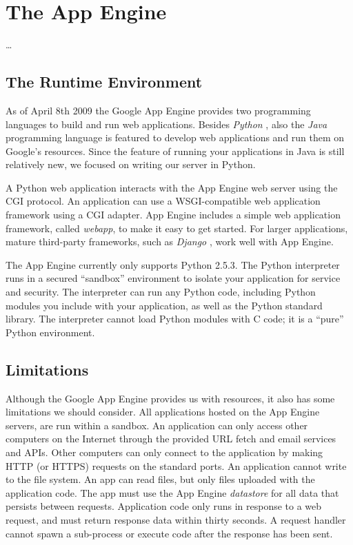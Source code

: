 \section{The App Engine}
\ldots

\subsection{The Runtime Environment}
As of April 8th 2009 \cite{app-engine-java} the Google App Engine provides two
programming languages to build and run web applications. Besides \emph{Python}
\cite{python-www}, also the \emph{Java} \cite{java-www} programming language is
featured to develop web applications and run them on Google's resources. Since
the feature of running your applications in Java is still relatively new, we
focused on writing our server in Python.

A Python web application interacts with the App Engine web server using the CGI
protocol. An application can use a WSGI-compatible web application framework
using a CGI adapter. App Engine includes a simple web application framework,
called \emph{webapp}, to make it easy to get started. For larger applications,
mature third-party frameworks, such as \emph{Django} \cite{django-www}, work
well with App Engine.

The App Engine currently only supports Python 2.5.3. The Python interpreter runs
in a secured ``sandbox'' environment to isolate your application for service and
security. The interpreter can run any Python code, including Python modules you
include with your application, as well as the Python standard library. The
interpreter cannot load Python modules with C code; it is a ``pure'' Python
environment.

\subsection{Limitations}
Although the Google App Engine provides us with resources, it also has some
limitations we should consider. All applications hosted on the App Engine
servers, are run within a sandbox. An application can only access other computers
on the Internet through the provided URL fetch and email services and APIs. Other
computers can only connect to the application by making HTTP (or HTTPS) requests
on the standard ports. An application cannot write to the file system. An app can
read files, but only files uploaded with the application code. The app must use
the App Engine \emph{datastore} for all data that persists between requests.
Application code only runs in response to a web request, and must return response
data within thirty seconds. A request handler cannot spawn a sub-process or
execute code after the response has been sent.

